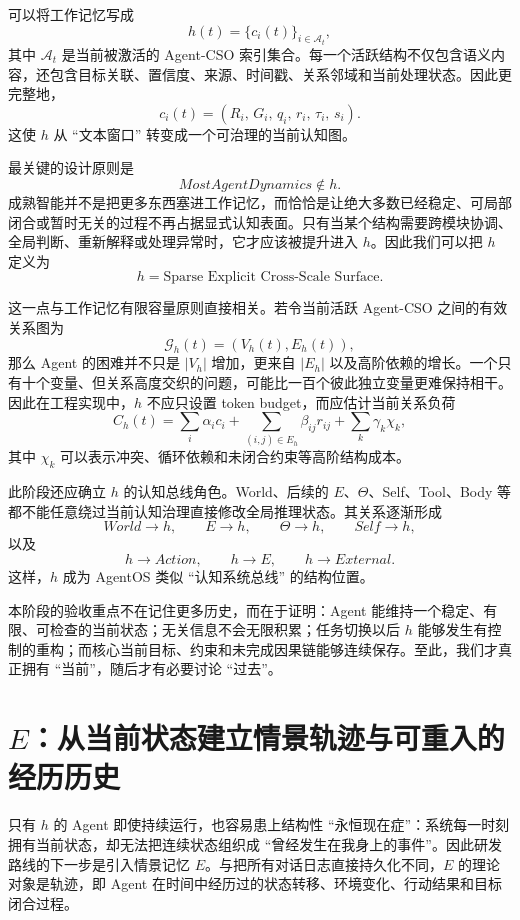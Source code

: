 可以将工作记忆写成
\[
h(t)
=
\{
c_i(t)
\}_{i\in\mathcal A_t},
\]
其中 $\mathcal A_t$ 是当前被激活的 Agent-CSO 索引集合。每一个活跃结构不仅包含语义内容，还包含目标关联、置信度、来源、时间戳、关系邻域和当前处理状态。因此更完整地，
\[
c_i(t)
=
\left(
R_i,\,
G_i,\,
q_i,\,
r_i,\,
\tau_i,\,
s_i
\right).
\]
这使 $h$ 从 ``文本窗口'' 转变成一个可治理的当前认知图。

最关键的设计原则是
\[
\boxed{
MostAgentDynamics\notin h.
}
\]
成熟智能并不是把更多东西塞进工作记忆，而恰恰是让绝大多数已经稳定、可局部闭合或暂时无关的过程不再占据显式认知表面。只有当某个结构需要跨模块协调、全局判断、重新解释或处理异常时，它才应该被提升进入 $h$。因此我们可以把 $h$ 定义为
\[
\boxed{
h=\text{Sparse Explicit Cross-Scale Surface}.
}
\]

这一点与工作记忆有限容量原则直接相关。若令当前活跃 Agent-CSO 之间的有效关系图为
\[
\mathcal G_h(t)
=
\left(
V_h(t),E_h(t)
\right),
\]
那么 Agent 的困难并不只是 $|V_h|$ 增加，更来自 $|E_h|$ 以及高阶依赖的增长。一个只有十个变量、但关系高度交织的问题，可能比一百个彼此独立变量更难保持相干。因此在工程实现中，$h$ 不应只设置 token budget，而应估计当前关系负荷
\[
C_h(t)
=
\sum_i \alpha_i c_i
+
\sum_{(i,j)\in E_h}\beta_{ij}r_{ij}
+
\sum_k\gamma_k\chi_k,
\]
其中 $\chi_k$ 可以表示冲突、循环依赖和未闭合约束等高阶结构成本。

此阶段还应确立 $h$ 的认知总线角色。World、后续的 $E$、$\Theta$、Self、Tool、Body 等都不能任意绕过当前认知治理直接修改全局推理状态。其关系逐渐形成
\[
World\rightarrow h,\qquad
E\rightarrow h,\qquad
\Theta\rightarrow h,\qquad
Self\rightarrow h,
\]
以及
\[
h\rightarrow Action,\qquad
h\rightarrow E,\qquad
h\rightarrow External.
\]
这样，$h$ 成为 AgentOS 类似 ``认知系统总线'' 的结构位置。

本阶段的验收重点不在记住更多历史，而在于证明：Agent 能维持一个稳定、有限、可检查的当前状态；无关信息不会无限积累；任务切换以后 $h$ 能够发生有控制的重构；而核心当前目标、约束和未完成因果链能够连续保存。至此，我们才真正拥有 ``当前''，随后才有必要讨论 ``过去''。

\section{$E$：从当前状态建立情景轨迹与可重入的经历历史}

只有 $h$ 的 Agent 即使持续运行，也容易患上结构性 ``永恒现在症''：系统每一时刻拥有当前状态，却无法把连续状态组织成 ``曾经发生在我身上的事件''。因此研发路线的下一步是引入情景记忆 $E$。与把所有对话日志直接持久化不同，$E$ 的理论对象是轨迹，即 Agent 在时间中经历过的状态转移、环境变化、行动结果和目标闭合过程。

